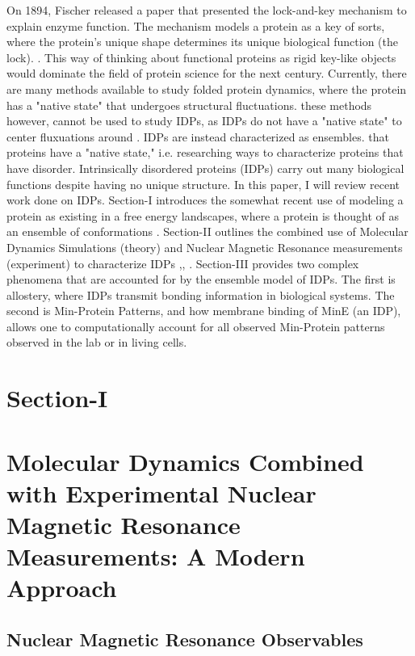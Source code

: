 \documentclass{article}
\begin{document}
On 1894, Fischer released a paper that presented the lock-and-key mechanism to explain enzyme function.
The mechanism models a protein as a key of sorts, where the protein's unique shape determines its unique biological function (the lock). \cite{fischer_einfluss_1894}.
This way of thinking about functional proteins as rigid key-like objects would dominate the field of protein science for the next century.
Currently, there are many methods available to study folded protein dynamics, where the protein has a "native state" that undergoes structural fluctuations. these methods however, cannot be used to study IDPs, as IDPs do not have a "native state" to center fluxuations around \cite{felliIntrinsicallyDisorderedProteins2015}.
IDPs are instead characterized as ensembles. 
that proteins have a "native state," i.e.  researching ways to characterize proteins that have disorder. Intrinsically disordered proteins (IDPs) carry out many biological functions despite having no unique structure\cite{dunker_intrinsic_2002}. In this paper, I will review recent work done on IDPs. Section-I introduces the somewhat recent use of modeling a protein as existing in a free energy landscapes, where a protein is thought of as an ensemble of conformations \cite{lau_lattice_1989}\cite{miller_ligand_1997}. Section-II outlines the combined use of Molecular Dynamics Simulations (theory) and Nuclear Magnetic Resonance measurements (experiment) to characterize IDPs \cite{fu_structure_dynamics_2015},\cite{fisher_constructing_2011},\cite{motlagh_ensemble_2014} . Section-III provides two complex phenomena that are accounted for by the ensemble model of IDPs. The first is allostery, where IDPs transmit bonding information in biological systems. The second is Min-Protein Patterns, and how membrane binding of MinE (an IDP), allows one to computationally account for all observed Min-Protein patterns observed in the lab or in living cells. \cite{bonny_membrane_2013}

\section{Section-I}



\section{Molecular Dynamics Combined with Experimental Nuclear Magnetic Resonance Measurements: A Modern Approach}

\subsection{Nuclear Magnetic Resonance Observables}
\end{document}
